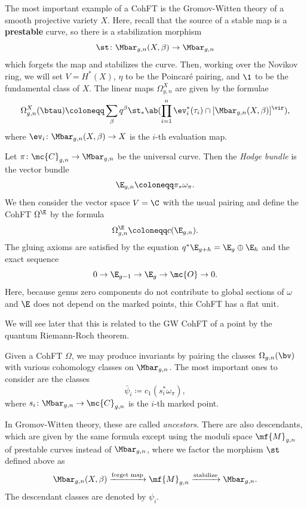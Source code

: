 \begin{exm}
    The most important example of a CohFT is the Gromov-Witten theory of a smooth projective variety $X$. Here, recall that the source of a stable map is a \textbf{prestable} curve, so there is a stabilization morphism
    \[ \st \colon \Mbar_{g,n}(X,\beta) \to \Mbar_{g,n} \]
    which forgets the map and stabilizes the curve. Then, working over the Novikov ring, we will set $V = H^*(X)$, $\eta$ to be the Poincar\'e pairing, and $\1$ to be the fundamental class of $X$. The linear maps $\Omega^X_{g,n}$ are given by the formulae
    \[ \Omega_{g,n}^X(\btau) \coloneqq \sum_{\beta} q^{\beta} \st_* \ab(\prod_{i=1}^n \ev_i^*(\tau_i) \cap [\Mbar_{g,n}(X,\beta)]^{\vir}), \]
    where $\ev_i \colon \Mbar_{g,n}(X,\beta) \to X$ is the $i$-th evaluation map.
\end{exm}

\begin{exm}
    Let $\pi \colon \mc{C}_{g,n} \to \Mbar_{g,n}$ be the universal curve. Then the \textit{Hodge bundle} is the vector bundle 
    \[ \E_{g,n} \coloneqq \pi_* \omega_{\pi}. \]
    We then consider the vector space $V = \C$ with the usual pairing and define the CohFT $\Omega^{\E}$ by the formula
    \[ \Omega^{\E}_{g,n} \coloneqq c(\E_{g,n}). \]
    The gluing axioms are satisfied by the equation $q^* \E_{g+h} = \E_g \oplus \E_h$ and the exact sequence
    \[ 0 \to \E_{g-1} \to \E_g \to \mc{O} \to 0. \]
    Here, because genus zero components do not contribute to global sections of $\omega$ and $\E$ does not depend on the marked points, this CohFT has a flat unit.
\end{exm}

\begin{rmk}
    We will see later that this is related to the GW CohFT of a point by the quantum Riemann-Roch theorem. 
\end{rmk}

Given a CohFT $\Omega$, we may produce invariants by pairing the classes $\Omega_{g,n}(\bv)$ with various cohomology classes on $\Mbar_{g,n}$. The most important ones to consider are the classes
\[ \bar{\psi}_i \coloneqq c_1( s_i^* \omega_{\pi} ), \]
where $s_i \colon \Mbar_{g,n} \to \mc{C}_{g,n}$ is the $i$-th marked point.

\begin{rmk}
    In Gromov-Witten theory, these are called \textit{ancestors}. There are also descendants, which are given by the same formula except using the moduli space $\mf{M}_{g,n}$ of prestable curves instead of $\Mbar_{g,n}$, where we factor the morphism $\st$ defined above as
    \[ \Mbar_{g,n}(X,\beta) \xrightarrow{\text{forget map}} \mf{M}_{g,n} \xrightarrow{\text{stabilize}} \Mbar_{g,n}. \]
    The descendant classes are denoted by $\psi_i$.
\end{rmk}

